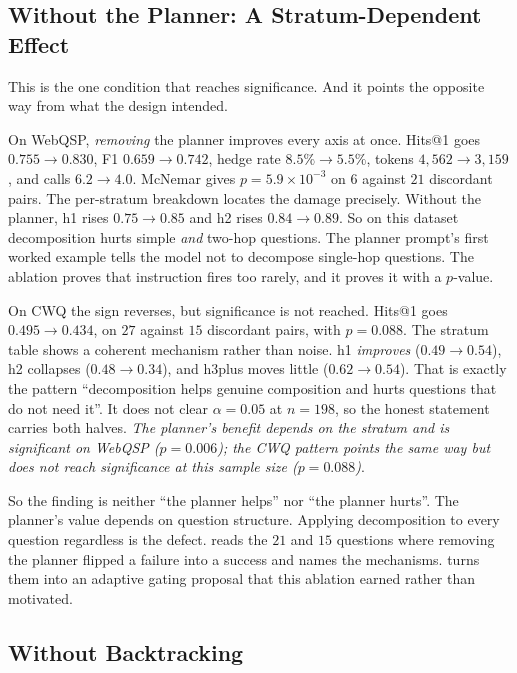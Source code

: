 \subsection{Without the Planner: A Stratum-Dependent Effect}

This is the one condition that reaches significance. And it points the
opposite way from what the design intended.

On WebQSP, \emph{removing} the planner improves every axis at once. Hits@1 goes
$0.755 \to 0.830$, F1 $0.659 \to 0.742$, hedge rate $8.5\% \to 5.5\%$, tokens
$4{,}562 \to 3{,}159$, and calls $6.2 \to 4.0$. McNemar gives $p = 5.9 \times
10^{-3}$ on $6$ against $21$ discordant pairs. The per-stratum breakdown locates
the damage precisely. Without the planner, \textsf{h1} rises $0.75 \to 0.85$ and
\textsf{h2} rises $0.84 \to 0.89$. So on this dataset decomposition hurts simple
\emph{and} two-hop questions. The planner prompt's first worked example tells
the model not to decompose single-hop questions. The ablation proves that
instruction fires too rarely, and it proves it with a $p$-value.

On CWQ the sign reverses, but significance is not reached. Hits@1 goes $0.495
\to
0.434$, on $27$ against $15$ discordant pairs, with $p = 0.088$. The stratum
table shows a coherent mechanism rather than noise. \textsf{h1} \emph{improves}
($0.49 \to 0.54$), \textsf{h2} collapses ($0.48 \to 0.34$), and \textsf{h3plus}
moves little ($0.62 \to 0.54$). That is exactly the pattern ``decomposition
helps genuine composition and hurts questions that do not need it''. It does not
clear $\alpha = 0.05$ at $n = 198$, so the honest statement carries both halves.
\emph{The planner's benefit depends on the stratum and is significant on WebQSP
($p = 0.006$); the CWQ pattern points the same way but does not reach
significance at this sample size ($p = 0.088$)}.

So the finding is neither ``the planner helps'' nor ``the planner hurts''. The
planner's value depends on question structure. Applying decomposition to every
question regardless is the defect.  reads the
$21$ and $15$ questions where removing the planner flipped a failure into a
success and names the mechanisms.  turns them into an adaptive
gating proposal that this ablation earned rather than motivated.

\subsection{Without Backtracking}


